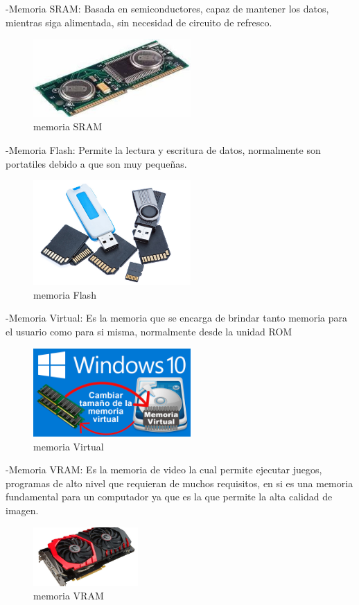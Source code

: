 \documentclass{article}
\begin{document}
-Memoria SRAM: Basada en semiconductores, capaz de mantener los datos, mientras siga alimentada, sin necesidad de circuito de refresco. \newline
\begin{figure}[h]
\includegraphics[width=6cm]{Estatica.jpg}
\centering
\caption{memoria SRAM}
\end{figure}

-Memoria Flash: Permite la lectura y escritura de datos, normalmente son portatiles debido a que son muy pequeñas. \newline
\begin{figure}[h]
\includegraphics[width=6cm]{Flash.jpg}
\centering
\caption{memoria Flash}
\end{figure}

-Memoria Virtual: Es la memoria que se encarga de brindar tanto memoria para el usuario como para si misma, normalmente desde la unidad ROM \newline
\begin{figure}[h]
\includegraphics[width=6cm]{Virtual.png}
\centering
\caption{memoria Virtual}
\end{figure}

-Memoria VRAM: Es la memoria de video la cual permite ejecutar juegos, programas de alto nivel que requieran de muchos requisitos, en si es una memoria fundamental para un computador ya que es la que permite la alta calidad de imagen. \newline
\begin{figure}[h]
\includegraphics[width=4cm]{Vram.jpg}
\centering
\caption{memoria VRAM}
\end{figure}
\end{document}
